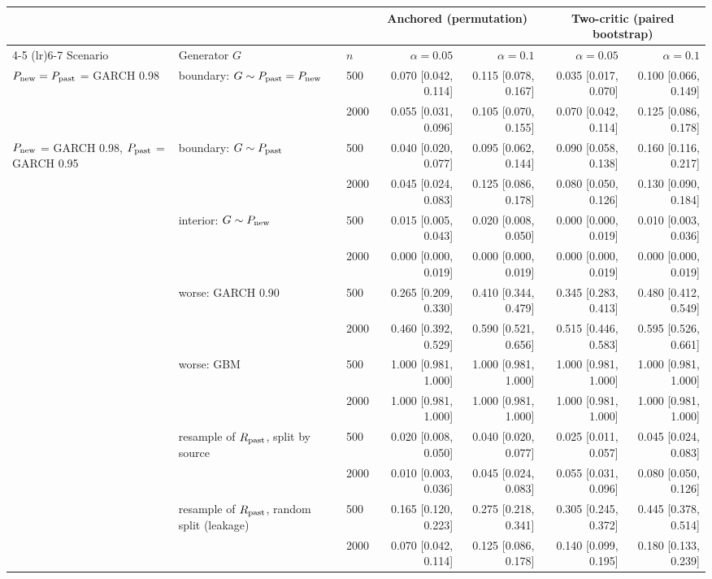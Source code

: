 \begin{tabular}{lllrrrr}
\toprule
 &  &  & \multicolumn{2}{c}{Anchored (permutation)} & \multicolumn{2}{c}{Two-critic (paired bootstrap)} \\
\cmidrule(lr){4-5} \cmidrule(lr){6-7}
Scenario & Generator $G$ & $n$ & $\alpha=0.05$ & $\alpha=0.1$ & $\alpha=0.05$ & $\alpha=0.1$ \\
\midrule
$P_{\rm new}=P_{\rm past}$ = GARCH 0.98 & boundary: $G\sim P_{\rm past}=P_{\rm new}$ & 500 & 0.070 [0.042, 0.114] & 0.115 [0.078, 0.167] & 0.035 [0.017, 0.070] & 0.100 [0.066, 0.149] \\
 &  & 2000 & 0.055 [0.031, 0.096] & 0.105 [0.070, 0.155] & 0.070 [0.042, 0.114] & 0.125 [0.086, 0.178] \\
$P_{\rm new}$ = GARCH 0.98, $P_{\rm past}$ = GARCH 0.95 & boundary: $G\sim P_{\rm past}$ & 500 & 0.040 [0.020, 0.077] & 0.095 [0.062, 0.144] & 0.090 [0.058, 0.138] & 0.160 [0.116, 0.217] \\
 &  & 2000 & 0.045 [0.024, 0.083] & 0.125 [0.086, 0.178] & 0.080 [0.050, 0.126] & 0.130 [0.090, 0.184] \\
 & interior: $G\sim P_{\rm new}$ & 500 & 0.015 [0.005, 0.043] & 0.020 [0.008, 0.050] & 0.000 [0.000, 0.019] & 0.010 [0.003, 0.036] \\
 &  & 2000 & 0.000 [0.000, 0.019] & 0.000 [0.000, 0.019] & 0.000 [0.000, 0.019] & 0.000 [0.000, 0.019] \\
 & worse: GARCH 0.90 & 500 & 0.265 [0.209, 0.330] & 0.410 [0.344, 0.479] & 0.345 [0.283, 0.413] & 0.480 [0.412, 0.549] \\
 &  & 2000 & 0.460 [0.392, 0.529] & 0.590 [0.521, 0.656] & 0.515 [0.446, 0.583] & 0.595 [0.526, 0.661] \\
 & worse: GBM & 500 & 1.000 [0.981, 1.000] & 1.000 [0.981, 1.000] & 1.000 [0.981, 1.000] & 1.000 [0.981, 1.000] \\
 &  & 2000 & 1.000 [0.981, 1.000] & 1.000 [0.981, 1.000] & 1.000 [0.981, 1.000] & 1.000 [0.981, 1.000] \\
 & resample of $R_{\rm past}$, split by source & 500 & 0.020 [0.008, 0.050] & 0.040 [0.020, 0.077] & 0.025 [0.011, 0.057] & 0.045 [0.024, 0.083] \\
 &  & 2000 & 0.010 [0.003, 0.036] & 0.045 [0.024, 0.083] & 0.055 [0.031, 0.096] & 0.080 [0.050, 0.126] \\
 & resample of $R_{\rm past}$, random split (leakage) & 500 & 0.165 [0.120, 0.223] & 0.275 [0.218, 0.341] & 0.305 [0.245, 0.372] & 0.445 [0.378, 0.514] \\
 &  & 2000 & 0.070 [0.042, 0.114] & 0.125 [0.086, 0.178] & 0.140 [0.099, 0.195] & 0.180 [0.133, 0.239] \\
\bottomrule
\end{tabular}
